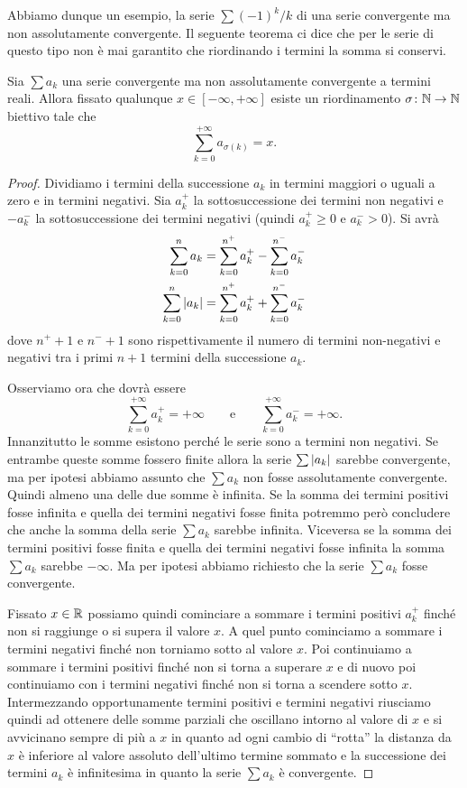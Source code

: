 Abbiamo dunque un esempio, la serie $\sum (-1)^k / k$ di una serie convergente ma non assolutamente convergente.
Il seguente teorema ci dice che per le serie di questo tipo non è mai garantito che riordinando i termini la somma si conservi.

\begin{theorem}%
\label{th:convergenza_condizionata}%
%
%
Sia $\sum a_k$ una serie convergente ma non assolutamente convergente a termini reali.
Allora fissato qualunque $x \in [-\infty , +\infty]$ esiste un riordinamento
$\sigma \colon {\mathbb N} \to {\mathbb N}$ biettivo tale che
\[
  \sum_{k=0}^{+\infty}  a_{\sigma(k)} = x.
\]
\end{theorem}
%
\begin{proof}
Dividiamo i termini della successione $a_k$ in termini maggiori o uguali a zero
e in termini negativi. Sia $a^+_k$ la sottosuccessione dei termini non negativi
e $-a^-_k$ la sottosuccessione
dei termini negativi (quindi $a^+_k\ge 0$ e $a^-_k > 0$). Si avrà
\begin{align*}
  \sum_{k=0}^n a_k &= \sum_{k=0}^{n^+} a^+_k - \sum_{k=0}^{n^-} a^-_k \\
  \sum_{k=0}^n {\left|a_k\right|} &= \sum_{k=0}^{n^+} a^+_k + \sum_{k=0}^{n^-} a^-_k
\end{align*}
dove $n^+ +1$ e $n^-+1$ sono rispettivamente
il numero di termini non-negativi e negativi
tra i primi $n+1$ termini della successione $a_k$.

Osserviamo ora che dovrà essere
\[
\sum_{k=0}^{+\infty} a_k^+ = +\infty \qquad \text{e} \qquad
\sum_{k=0}^{+\infty} a_k^- = +\infty.
\]
Innanzitutto le somme esistono perché le serie sono a termini non negativi.
Se entrambe queste somme fossero finite allora la serie $\sum{\left|a_k\right|}$ sarebbe convergente, ma per ipotesi abbiamo assunto che $\sum a_k$ non fosse
assolutamente convergente.
Quindi almeno una delle due somme è infinita. Se la somma dei termini positivi
fosse infinita e quella dei termini negativi fosse finita potremmo però
concludere che anche la somma della serie $\sum a_k$ sarebbe infinita.
Viceversa se la somma dei termini positivi fosse finita e quella dei termini
negativi fosse infinita la somma $\sum a_k$ sarebbe $-\infty$. Ma per ipotesi
abbiamo richiesto che la serie $\sum a_k$ fosse convergente.

Fissato $x\in {\mathbb R}$ possiamo quindi cominciare a sommare i termini positivi
$a^+_k$ finché non si raggiunge o si supera il valore $x$. A quel punto cominciamo a sommare i termini negativi finché non torniamo sotto al valore $x$.
Poi continuiamo a sommare i termini positivi finché non si torna a superare $x$
e di nuovo poi continuiamo con i termini negativi finché non si torna a scendere
sotto $x$. Intermezzando opportunamente termini positivi e termini negativi
riusciamo quindi ad ottenere delle somme parziali che oscillano intorno al valore 
di $x$ e si avvicinano sempre di più a $x$ in quanto ad ogni cambio di ``rotta'' 
la distanza da $x$ è inferiore al valore assoluto dell'ultimo termine sommato 
e la successione dei termini $a_k$ è infinitesima in quanto la serie $\sum a_k$ è convergente.


\end{proof}
